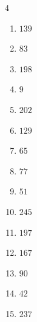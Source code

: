 \begin{multicols}{4}
\begin{enumerate}
  \item $139$


  \item $83$


  \item $198$


  \item $9$


  \item $202$


  \item $129$


  \item $65$


  \item $77$


  \item $51$


  \item $245$


  \item $197$


  \item $167$


  \item $90$


  \item $42$


\columnbreak %

\resetques

  \item $237$



\end{enumerate}
\end{multicols}
